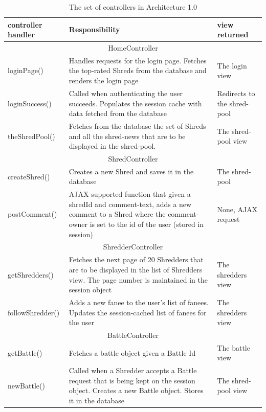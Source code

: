 \begin{table}
\centering
    \begin{tabular}{ |  l  | p{6cm} | p{3.5cm} |}
    \hline
	\textbf{controller handler} & \textbf{Responsibility} & \textbf{view returned} \\ \hline    
    \multicolumn{3}{|c|}{HomeController} \\ \hline
    loginPage() & Handles requests for the login page. Fetches the top-rated Shreds from the database and renders the login page & The login view \\ \hline    
    
    loginSuccess() & Called when authenticating the user succeeds. Populates the session cache with data fetched from the database & Redirects to the shred-pool \\ \hline
    
    theShredPool() & Fetches from the database the set of Shreds and all the shred-news that are to be displayed in the shred-pool. & The shred-pool view \\ \hline    \multicolumn{3}{|c|}{ShredController} \\  \hline
   
     createShred() & Creates a new Shred and saves it in the database & The shred-pool \\ \hline

     postComment() & AJAX supported function that given a shredId and comment-text, adds a new comment to a Shred where the comment-owner is set to the id of the user (stored in session) & None, AJAX request \\ \hline
     
    \multicolumn{3}{|c|}{ShredderController} \\      \hline
getShredders() & Fetches the next page of 20 Shredders that are to be displayed in the list of Shredders view. The page number is maintained in the session object & The shredders view\\ \hline
followShredder() & Adds a new fanee to the user's list of fanees. Updates the session-cached list of fanees for the user  & The shredders view \\ \hline

 \multicolumn{3}{|c|}{BattleController} \\ \hline
 getBattle() & Fetches a battle object given a Battle Id & The battle view \\ \hline

newBattle() & Called when a Shredder accepts a Battle request that is being kept on the session object. Creates a new Battle object. Stores it in the database & The shred-pool view \\ \hline
    \end{tabular}
    \caption{The set of controllers in Architecture 1.0}
    \label{table:controllers}
\end{table}

